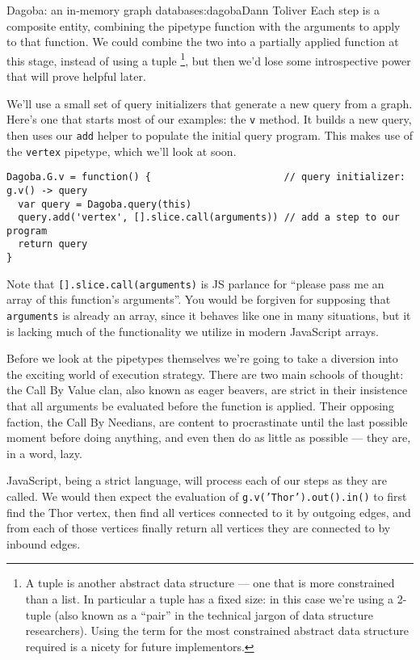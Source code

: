 \begin{aosachapter}{Dagoba: an in-memory graph database}{s:dagoba}{Dann Toliver}
Each step is a composite entity, combining the pipetype function with
the arguments to apply to that function. We could combine the two into a
partially applied function at this stage, instead of using a tuple
\footnote{A tuple is another abstract data structure --- one that is
  more constrained than a list. In particular a tuple has a fixed size:
  in this case we're using a 2-tuple (also known as a ``pair'' in the
  technical jargon of data structure researchers). Using the term for
  the most constrained abstract data structure required is a nicety for
  future implementors.}, but then we'd lose some introspective power
that will prove helpful later.

We'll use a small set of query initializers that generate a new query
from a graph. Here's one that starts most of our examples: the
\texttt{v} method. It builds a new query, then uses our \texttt{add}
helper to populate the initial query program. This makes use of the
\texttt{vertex} pipetype, which we'll look at soon.

\begin{verbatim}
Dagoba.G.v = function() {                       // query initializer: g.v() -> query
  var query = Dagoba.query(this)
  query.add('vertex', [].slice.call(arguments)) // add a step to our program
  return query
}
\end{verbatim}

Note that \texttt{{[}{]}.slice.call(arguments)} is JS parlance for
``please pass me an array of this function's arguments''. You would be
forgiven for supposing that \texttt{arguments} is already an array,
since it behaves like one in many situations, but it is lacking much of
the functionality we utilize in modern JavaScript arrays.

\label{the-problem-with-being-eager}

Before we look at the pipetypes themselves we're going to take a
diversion into the exciting world of execution strategy. There are two
main schools of thought: the Call By Value clan, also known as eager
beavers, are strict in their insistence that all arguments be evaluated
before the function is applied. Their opposing faction, the Call By
Needians, are content to procrastinate until the last possible moment
before doing anything, and even then do as little as possible --- they
are, in a word, lazy.

JavaScript, being a strict language, will process each of our steps as
they are called. We would then expect the evaluation of
\texttt{g.v('Thor').out().in()} to first find the Thor vertex, then find
all vertices connected to it by outgoing edges, and from each of those
vertices finally return all vertices they are connected to by inbound
edges.


\end{aosachapter}
